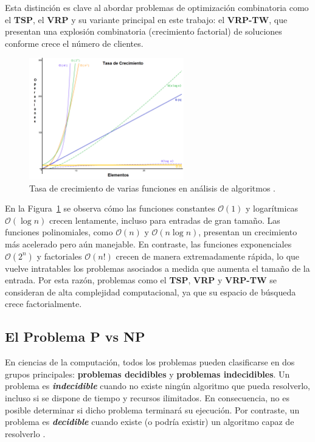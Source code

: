 \documentclass[12pt,titlepage,twoside,openright]{book}
\begin{document}
Esta distinción es clave al abordar problemas de optimización combinatoria como el \textbf{TSP}, el \textbf{VRP} y su variante principal en este trabajo: el \textbf{VRP-TW}, que presentan una explosión combinatoria (crecimiento factorial) de soluciones conforme crece el número de clientes.

\begin{figure}[H]
	\centering
	\includegraphics[width=0.6\textwidth]{Figuras/grafico-complejidad-computacionala3.png}
	\caption{Tasa de crecimiento de varias funciones en análisis de algoritmos \cite{numerentur2019}.}
	\label{fig:figura_complejidad_computacional}
\end{figure}

En la Figura~\ref{fig:figura_complejidad_computacional} se observa cómo las funciones constantes $\mathcal{O}(1)$ y logarítmicas $\mathcal{O}(\log n)$ crecen lentamente, incluso para entradas de gran tamaño. Las funciones polinomiales, como $\mathcal{O}(n)$ y $\mathcal{O}(n \log n)$, presentan un crecimiento más acelerado pero aún manejable. En contraste, las funciones exponenciales $\mathcal{O}(2^n)$ y factoriales $\mathcal{O}(n!)$ crecen de manera extremadamente rápida, lo que vuelve intratables los problemas asociados a medida que aumenta el tamaño de la entrada. Por esta razón, problemas como el \textbf{TSP}, \textbf{VRP} y \textbf{VRP-TW} se consideran de alta complejidad computacional, ya que su espacio de búsqueda crece factorialmente.
\subsection{El Problema P vs NP}

En ciencias de la computación, todos los problemas pueden clasificarse en dos grupos principales: \textbf{problemas decidibles} y \textbf{problemas indecidibles}. Un problema es \textbf{\emph{indecidible}} cuando no existe ningún algoritmo que pueda resolverlo, incluso si se dispone de tiempo y recursos ilimitados. En consecuencia, no es posible determinar si dicho problema terminará su ejecución. Por contraste, un problema es \textbf{\emph{decidible}} cuando existe (o podría existir) un algoritmo capaz de resolverlo \citep{maldonado2013problema}.
\end{document}
